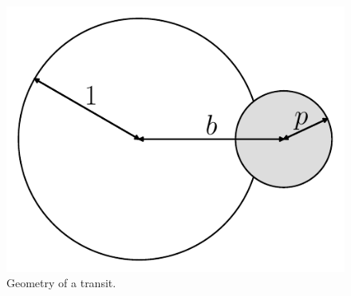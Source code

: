 \documentclass[12pt,preprint]{aastex}
\newcommand{\figlabel}[1]{\label{fig:#1}}
\begin{document}
\clearpage

\begin{figure}[htbp]
    \begin{center}
        \includegraphics[width=\textwidth]{figures/geom.pdf}
    \end{center}
    \caption{Geometry of a transit. \figlabel{geom}}
\end{figure}
\end{document}
